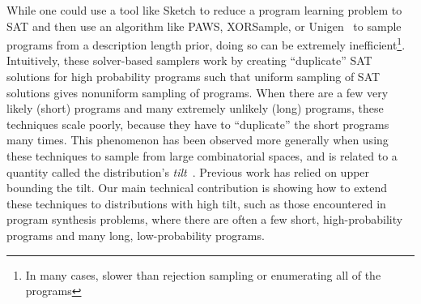 \documentclass{article}
\begin{document}
While one could use a tool like Sketch to reduce a program learning problem to SAT
and then use an algorithm like PAWS, XORSample, or Unigen~\cite{ermon2013embed,gomes2006near,chakraborty2014balancing}
to sample programs from a description length prior,
doing so can be extremely inefficient\footnote{In many cases, slower than rejection sampling or enumerating all of the programs}.
Intuitively,
these solver-based samplers work by creating ``duplicate'' SAT solutions for high probability programs
such that uniform sampling of SAT solutions gives nonuniform sampling of programs.
When there are a few very likely (short) programs and many extremely unlikely (long) programs,
these techniques scale poorly, because they have to ``duplicate'' the short programs many times.
This phenomenon has been observed more generally when using these techniques to sample from large combinatorial spaces,
and is related to a quantity called the distribution's \emph{tilt}~\cite{chakraborty2014distribution}.
Previous work has relied on upper bounding the tilt.
Our main technical contribution is showing how to extend these techniques to distributions with high tilt,
such as those encountered in program synthesis problems,
where there are often a few short, high-probability programs and many long, low-probability programs.
\end{document}
